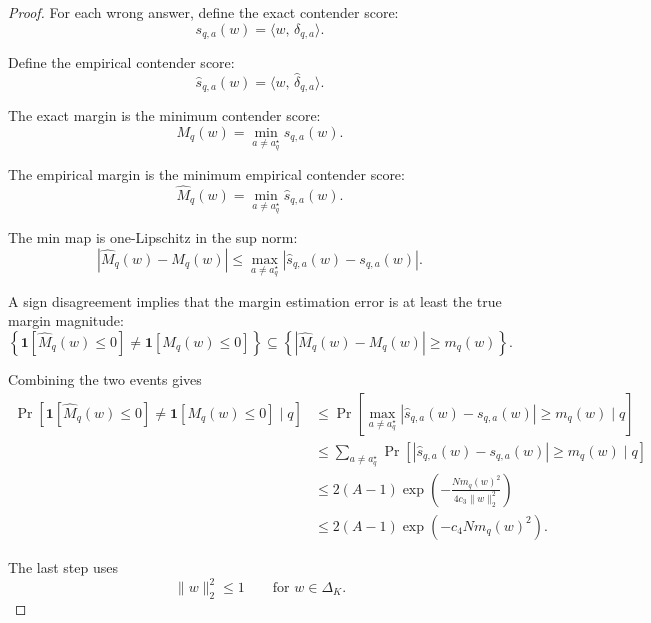 \documentclass{article} %
\providecommand{\simplex}{\Delta_K}
\providecommand{\ip}[2]{\langle #1,\, #2\rangle}
\providecommand{\dhat}{\widehat{\delta}}
\providecommand{\Mhat}{\widehat{M}}
\begin{document}
\begin{proof}
For each wrong answer, define the exact contender score:
\begin{equation}
\label{eq:lem4-proof-s}
s_{q,a}(w)
=
\ip{w}{\delta_{q,a}} .
\end{equation}

Define the empirical contender score:
\begin{equation}
\label{eq:lem4-proof-shat}
\widehat{s}_{q,a}(w)
=
\ip{w}{\dhat_{q,a}} .
\end{equation}

The exact margin is the minimum contender score:
\begin{equation}
\label{eq:lem4-proof-M}
M_q(w)
=
\min_{a\ne a_q^\star}s_{q,a}(w).
\end{equation}

The empirical margin is the minimum empirical contender score:
\begin{equation}
\label{eq:lem4-proof-Mhat}
\Mhat_q(w)
=
\min_{a\ne a_q^\star}\widehat{s}_{q,a}(w).
\end{equation}

The min map is one-Lipschitz in the sup norm:
\begin{equation}
\label{eq:lem4-proof-lip}
|\Mhat_q(w)-M_q(w)|
\le
\max_{a\ne a_q^\star}
|\widehat{s}_{q,a}(w)-s_{q,a}(w)|.
\end{equation}

A sign disagreement implies that the margin estimation error is at least the
true margin magnitude:
\begin{equation}
\label{eq:lem4-proof-event}
\left\{
\mathbf 1[\Mhat_q(w)\le 0]\ne \mathbf 1[M_q(w)\le 0]
\right\}
\subseteq
\left\{
|\Mhat_q(w)-M_q(w)|\ge m_q(w)
\right\}.
\end{equation}

Combining the two events gives
\begin{align}
\Pr\!\left[
\mathbf 1[\Mhat_q(w)\le 0]\ne \mathbf 1[M_q(w)\le 0]
\mid q
\right]
&\le
\Pr\!\left[
\max_{a\ne a_q^\star}
|\widehat{s}_{q,a}(w)-s_{q,a}(w)|
\ge m_q(w)
\mid q
\right]
\label{eq:lem4-proof-a}
\\
&\le
\sum_{a\ne a_q^\star}
\Pr\!\left[
|\widehat{s}_{q,a}(w)-s_{q,a}(w)|
\ge m_q(w)
\mid q
\right]
\label{eq:lem4-proof-b}
\\
&\le
2(A-1)
\exp\!\left(
-\frac{N m_q(w)^2}{4c_3\|w\|_2^2}
\right)
\label{eq:lem4-proof-c}
\\
&\le
2(A-1)
\exp\!\left(-c_4 N m_q(w)^2\right).
\label{eq:lem4-proof-d}
\end{align}

The last step uses
\begin{equation}
\label{eq:lem4-proof-simplex}
\|w\|_2^2
\le
1
\qquad
\text{for }w\in\simplex .
\end{equation}
\end{proof}
\end{document}
